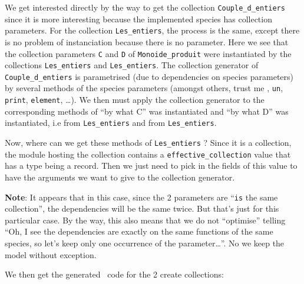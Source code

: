 We get interested directly by the way to get the collection
{\tt Couple\_d\_entiers} since it is more interesting because the
implemented species has collection parameters. For the collection
{\tt Les\_entiers}, the process is the same, except there is no
problem of instanciation because there is no parameter.
Here we see that the collection parameters {\tt C} and {\tt D} of
{\tt Monoide\_produit} were instantiated by the collections
{\tt Les\_entiers} and {\tt Les\_entiers}. The collection generator of
{\tt Couple\_d\_entiers} is parametrised (due to dependencies on
species parameters) by several methods of the species parameters
(amongst others, trust me \smiley, {\tt un}, {\tt print},
{\tt element}, \ldots).
We then must apply the collection generator to the corresponding
methods of ``by what C'' was instantiated and ``by what D'' was
instantiated, i.e from {\tt Les\_entiers} and from
{\tt Les\_entiers}.

Now, where can we get these methods of {\tt Les\_entiers} ? Since it is
a collection, the module hosting the collection contains a
{\tt effective\_collection} value that has a type being a record. Then
we just need to pick in the fields of this value to have the arguments
we want to give to the collection generator.

\medskip
{\bf Note}: It appears that in this case, since the 2
parameters are ``{\tt is} the same collection'', the dependencies will
be the same twice. But that's just for this particular case. By the
way, this also means that we do not ``optimise'' telling ``Oh, I see
the dependencies are exactly on the same functions of the same species,
so let's keep only one occurrence of the parameter\ldots''. No we keep
the model without exception.

We then get the generated \ocaml\ code for the 2 create collections:

